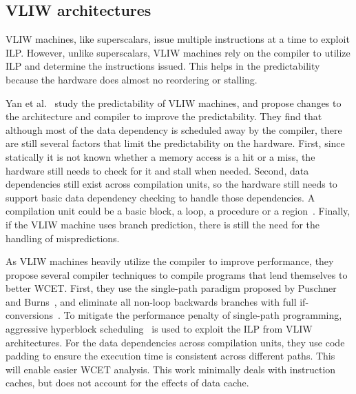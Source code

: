
\subsection{VLIW architectures}
\label{sec:RTVLIW}
VLIW machines, like superscalars, issue multiple instructions at a time to exploit ILP.
However, unlike superscalars, VLIW machines rely on the compiler to utilize ILP and determine the instructions issued.  
This helps in the predictability because the hardware does almost no reordering or stalling.
 
Yan et al.~\cite{Yan2008VLIW} study the predictability of VLIW machines, and propose changes to the architecture and compiler to improve the predictability. 
They find that although most of the data dependency is scheduled away by the compiler, there are still several factors that limit the predictability on the hardware. 
First, since statically it is not known whether a memory access is a hit or a miss, the hardware still needs to check for it and stall when needed. 
Second, data dependencies still exist across compilation units, so the hardware still needs to support basic data dependency checking to handle those dependencies.
A compilation unit could be a basic block, a loop, a procedure or a region~\cite{Hank:1995:RCI:225160.225189}. 
Finally, if the VLIW machine uses branch prediction, there is still the need for the handling of mispredictions.

As VLIW machines heavily utilize the compiler to improve performance, they propose several compiler techniques to compile programs that lend themselves to better WCET. 
First, they use the single-path paradigm proposed by Puschner and Burns~\cite{Puschner:2002:WTP:882515.885528}, and eliminate all non-loop backwards branches with full if-conversions~\cite{Allen:1983:CCD:567067.567085}.  
To mitigate the performance penalty of single-path programming, aggressive hyperblock scheduling~\cite{Mahlke:1992:ECS:144953.144998} is used to exploit the ILP from VLIW architectures. 
For the data dependencies across compilation units, they use code padding to ensure the execution time is consistent across different paths.    
This will enable easier WCET analysis. 
This work minimally deals with instruction caches, but does not account for the effects of data cache. 

